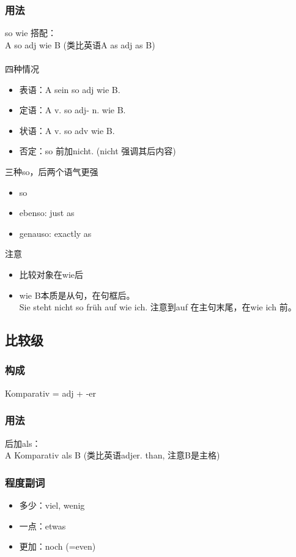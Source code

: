 \subsubsection{用法}
so wie 搭配：\\
A so adj wie B (类比英语A as adj as B) \\
\\
四种情况
\begin{itemize}
    \item 表语：A sein so adj wie B.
    \item 定语：A v. so adj- n. wie B.
    \item 状语：A v. so adv wie B.
    \item 否定：so 前加nicht. (nicht 强调其后内容)
\end{itemize}
三种so，后两个语气更强
\begin{itemize}
    \item so
    \item ebenso: just as
    \item genauso: exactly as
\end{itemize}
注意
\begin{itemize}
    \item 比较对象在wie后
    \item wie B本质是从句，在句框后。\\
          Sie steht nicht so früh auf wie ich. 注意到auf 在主句末尾，在wie ich 前。
\end{itemize}

\subsection{比较级}
\subsubsection{构成}
\begin{center}
    \begin{myquote}
        Komparativ = adj + -er \\
    \end{myquote}
\end{center}

\subsubsection{用法}
后加als：\\
A Komparativ als B (类比英语adjer. than, 注意B是主格)

\subsubsection{程度副词}
\begin{itemize}
    \item 多少：viel, wenig
    \item 一点：etwas
    \item 更加：noch (=even)
\end{itemize}

